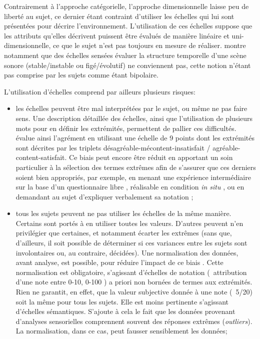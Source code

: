 Contrairement à l'approche catégorielle, l'approche dimensionnelle laisse peu de liberté au sujet, ce dernier étant contraint d'utiliser les échelles qui lui sont présentées pour décrire l'environnement. L'utilisation de ces échelles suppose que les attributs qu'elles décrivent puissent être évalués de manière linéaire et uni-dimensionnelle, ce que le sujet n'est pas toujours en mesure de réaliser. \citep{raimbault2006qualitative} montre notamment que des échelles sensées évaluer la structure temporelle d'une scène sonore (stable/instable ou figé/évolutif) ne conviennent pas, cette notion n'étant pas comprise par les sujets comme étant bipolaire.

L'utilisation d'échelles comprend par ailleurs plusieurs risques:

\begin{itemize}
\item les échelles peuvent être mal interprétées par le sujet, ou même ne pas faire sens. Une description détaillée des échelles, ainsi que l'utilisation de plusieurs mots pour en définir les extrémités, permettent de pallier ces difficultés. \citep{hall2013exploratory} évalue ainsi l'agrément en utilisant une échelle de 9 points dont les extrémités sont décrites par les triplets désagréable-mécontent-insatisfait / agréable-content-satisfait. Ce biais peut encore être réduit en apportant un soin particulier à la sélection des termes extrêmes afin de s'assurer que ces derniers soient bien appropriés, par exemple, en menant une expérience intermédiaire sur la base d'un questionnaire libre \citep{guastavino2004perceptual}, réalisable en condition \emph{in situ} \citep{kang2010semantic,hong2013designing}, ou en demandant au sujet d'expliquer verbalement sa notation \citep{raimbault2006qualitative};
\item tous les sujets peuvent ne pas utiliser les échelles de la même manière. Certains sont portés à en utiliser toutes les valeurs. D'autres peuvent n'en privilégier que certaines, et notamment écarter les extrêmes (sans que, d'ailleurs, il soit possible de déterminer si ces variances entre les sujets sont involontaires ou, au contraire, décidées). Une normalisation des données, avant analyse, est possible, pour réduire l'impact de ce biais \citep{defreville2004aactivity,lavandier2006contribution,nielbo2013investigating,hong2013designing}. Cette normalisation est obligatoire, s'agissant d'échelles de notation (\eg~attribution d'une note entre 0-10, 0-100 \etc) a priori non bornées de termes aux extrémités. Rien ne garantit, en effet, que la valeur subjective donnée à une note (\eg~5/20) soit la même pour tous les sujets. Elle est moins pertinente s'agissant d'échelles sémantiques. S'ajoute à cela le fait que les données provenant d'analyses sensorielles comprennent souvent des réponses extrêmes (\emph{outliers}). La normalisation, dans ce cas, peut fausser sensiblement les données;


\end{itemize}
